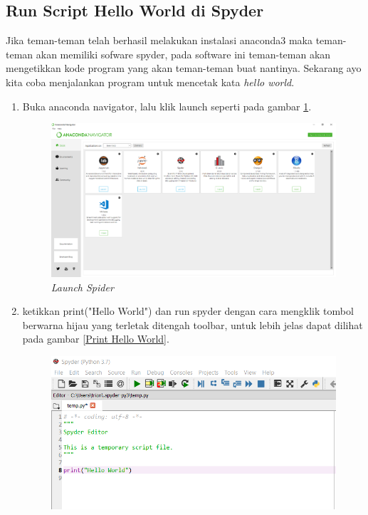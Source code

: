 \subsection{Run Script Hello World di Spyder}
Jika teman-teman telah berhasil melakukan instalasi anaconda3 maka teman-teman akan memiliki sofware spyder, pada software ini teman-teman akan mengetikkan kode program yang akan teman-teman buat nantinya. Sekarang ayo kita coba menjalankan program untuk mencetak kata \textit{hello world}.
\begin{enumerate}
\item Buka anaconda navigator, lalu klik launch seperti pada gambar \ref{Anaconda Navigator}.
\begin{figure}[!htbp]
    \centering
    \includegraphics[scale=0.3]{figures/navigator}
    \caption{\textit{Launch Spider}}
    \label{Anaconda Navigator}
\end{figure}
\item ketikkan print("Hello World") dan run spyder dengan cara mengklik tombol berwarna hijau yang terletak ditengah toolbar, untuk lebih jelas dapat dilihat pada gambar \ref{Print Hello World}.
\begin{figure}[!htbp]
    \centering
    \includegraphics[scale=0.75]{figures/helloworld}

\end{figure}
\end{enumerate}
